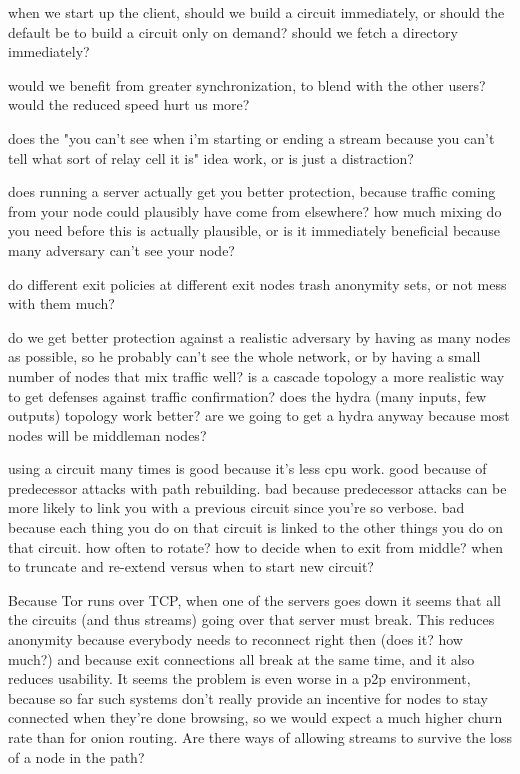\documentclass[times,10pt,twocolumn]{article}
\begin{document}
when we start up the client, should we build a circuit immediately,
or should the default be to build a circuit only on demand? should we
fetch a directory immediately?

would we benefit from greater synchronization, to blend with the other
users? would the reduced speed hurt us more?

does the "you can't see when i'm starting or ending a stream because
you can't tell what sort of relay cell it is" idea work, or is just
a distraction?

does running a server actually get you better protection, because traffic
coming from your node could plausibly have come from elsewhere? how
much mixing do you need before this is actually plausible, or is it
immediately beneficial because many adversary can't see your node?

do different exit policies at different exit nodes trash anonymity sets,
or not mess with them much?

do we get better protection against a realistic adversary by having as
many nodes as possible, so he probably can't see the whole network,
or by having a small number of nodes that mix traffic well? is a
cascade topology a more realistic way to get defenses against traffic
confirmation? does the hydra (many inputs, few outputs) topology work
better? are we going to get a hydra anyway because most nodes will be
middleman nodes?

using a circuit many times is good because it's less cpu work.
  good because of predecessor attacks with path rebuilding.
  bad because predecessor attacks can be more likely to link you with a
    previous circuit since you're so verbose.
  bad because each thing you do on that circuit is linked to the other
    things you do on that circuit.
  how often to rotate?
  how to decide when to exit from middle?
  when to truncate and re-extend versus when to start new circuit?

Because Tor runs over TCP, when one of the servers goes down it seems
that all the circuits (and thus streams) going over that server must
break. This reduces anonymity because everybody needs to reconnect
right then (does it? how much?) and because exit connections all break
at the same time, and it also reduces usability. It seems the problem
is even worse in a p2p environment, because so far such systems don't
really provide an incentive for nodes to stay connected when they're
done browsing, so we would expect a much higher churn rate than for
onion routing. Are there ways of allowing streams to survive the loss
of a node in the path?
\end{document}

